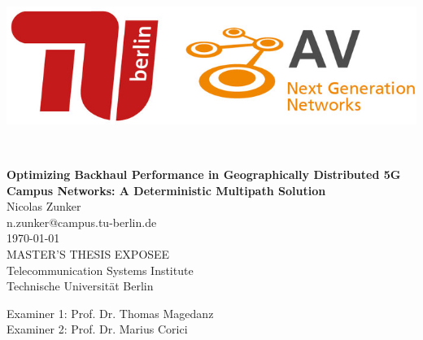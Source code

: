
\thispagestyle{empty}

\begin{center}
\includegraphics[width=.67\linewidth, height=.2\linewidth]{fig/Logo_Header}
\end{center}
\mbox{}\\[1pc]
\begin{center}
    \huge{ \bfseries Optimizing Backhaul Performance in Geographically Distributed 5G Campus Networks: A Deterministic Multipath Solution}\\[2pc]

    \Large{Nicolas Zunker}\\
    \large{n.zunker@campus.tu-berlin.de}\\[1pc]
    \large{\today}\\[2pc]

    MASTER'S THESIS EXPOSEE\\
    Telecommunication Systems Institute\\
    Technische Universität Berlin
\end{center}
\vfill

Examiner 1: Prof. Dr. Thomas Magedanz
\hfill{}\\
Examiner 2: Prof. Dr. Marius Corici

\afterpage{\null\thispagestyle{empty}\newpage}
